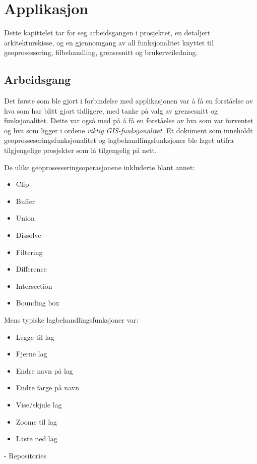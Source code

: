 \chapter{Applikasjon}

Dette kapittelet tar for seg arbeidsgangen i prosjektet, en detaljert arkitekturskisse, og en gjennomgang av all funksjonalitet knyttet til geoprosessering, filbehandling, grensesnitt og brukerveiledning. 

\section{Arbeidsgang}

Det første som ble gjort i forbindelse med applikasjonen var å få en forståelse av hva som har blitt gjort tidligere, med tanke på valg av grensesnitt og funksjonalitet. Dette var også med på å få en forståelse av hva som var forventet og hva som ligger i ordene \textit{viktig GIS-funksjonalitet}. Et dokument som inneholdt geoprosseseringsfunksjonalitet og lagbehandlingsfunksjoner ble laget utifra tilgjengelige prosjekter\cite{Johanessen} som lå tilgengelig på nett. 

De ulike geoprosesseringsoperasjonene inkluderte blant annet: 
\begin{itemize}
    \item Clip
    \item Buffer
    \item Union
    \item Dissolve
    \item Filtering
    \item Difference
    \item Intersection
    \item Bounding box
\end{itemize}

Mens typiske lagbehandlingsfunksjoner var:
\begin{itemize}
    \item Legge til lag
    \item Fjerne lag
    \item Endre navn på lag
    \item Endre farge på navn
    \item Vise/skjule lag
    \item Zoome til lag
    \item Laste ned lag
\end{itemize}

- Repositories

